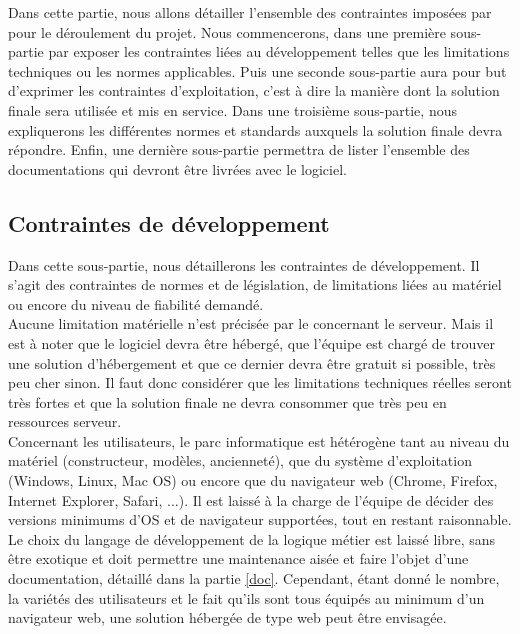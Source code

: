 Dans cette partie, nous allons détailler l'ensemble des contraintes imposées par \nomClient{} pour le déroulement du projet. Nous commencerons, dans une première sous-partie par exposer les contraintes liées au développement telles que les limitations techniques ou les normes applicables. Puis une seconde sous-partie aura pour but d'exprimer les contraintes d'exploitation, c'est à dire la manière dont la solution finale sera utilisée et mis en service. Dans une troisième sous-partie, nous expliquerons les différentes normes et standards auxquels la solution finale devra répondre. Enfin, une dernière sous-partie permettra de lister l'ensemble des documentations qui devront être livrées avec le logiciel.


\subsection{Contraintes de développement}
Dans cette sous-partie, nous détaillerons les contraintes de développement. Il s'agit des contraintes de normes et de législation, de limitations liées au matériel ou encore du niveau de fiabilité demandé.\\


Aucune limitation matérielle n'est précisée par le \client{} concernant le serveur. Mais il est à noter que le logiciel devra être hébergé, que l'équipe \PICCourt{} est chargé de trouver une solution d'hébergement et que ce dernier devra être gratuit si possible, très peu cher sinon. Il faut donc considérer que les limitations techniques réelles seront très fortes et que la solution finale ne devra consommer que très peu en ressources serveur.\\

Concernant les utilisateurs, le parc informatique est hétérogène tant au niveau du matériel (constructeur, modèles, ancienneté), que du système d'exploitation (Windows, Linux, Mac OS) ou encore que du navigateur web (Chrome, Firefox, Internet Explorer, Safari, ...). Il est laissé à la charge de l'équipe \PICCourt{} de décider des versions minimums d'OS et de navigateur supportées, tout en restant raisonnable.\\


Le choix du langage de développement de la logique métier est laissé libre, sans être exotique et doit permettre une maintenance aisée et faire l'objet d'une documentation, détaillé dans la partie \ref{doc}. Cependant, étant donné le nombre, la variétés des utilisateurs et le fait qu'ils sont tous équipés au minimum d'un navigateur web, une solution hébergée de type web peut être envisagée.\\

